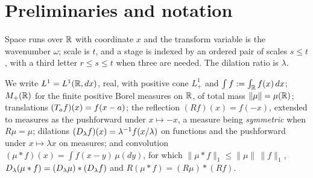 %
%
%

\chapter{Preliminaries and notation}
\label{ch:preliminaries}

Space runs over $\mathbb{R}$ with coordinate $x$ and the transform variable is the wavenumber
$\omega$; scale is $t$, and a stage is indexed by an ordered pair of scales $s \le t$, with
a third letter $r \le s \le t$ when three are needed. The dilation ratio is $\lambda$.

We write $L^1 = L^1(\mathbb{R}, dx)$, real, with positive cone $L^1_+$ and
$\int f := \int_{\mathbb{R}} f(x)\,dx$; $M_+(\mathbb{R})$ for the finite positive Borel measures on $\mathbb{R}$,
of total mass $\|\mu\| = \mu(\mathbb{R})$; translations $(T_{a} f)(x) = f(x-a)$; the reflection
$(Rf)(x) = f(-x)$, extended to measures as the pushforward under $x \mapsto -x$, a measure
being \emph{symmetric} when $R\mu = \mu$; dilations $(D_{\lambda} f)(x) = \lambda^{-1}
f(x/\lambda)$ on functions and the pushforward under $x \mapsto \lambda x$ on measures; and
convolution $(\mu * f)(x) = \int f(x-y)\,\mu(dy)$, for which $\|\mu * f\|_1 \le \|\mu\|\,\|f\|_1$,
$D_{\lambda}(\mu * f) = (D_{\lambda}\mu) * (D_{\lambda}f)$ and
$R(\mu * f) = (R\mu) * (Rf)$.

